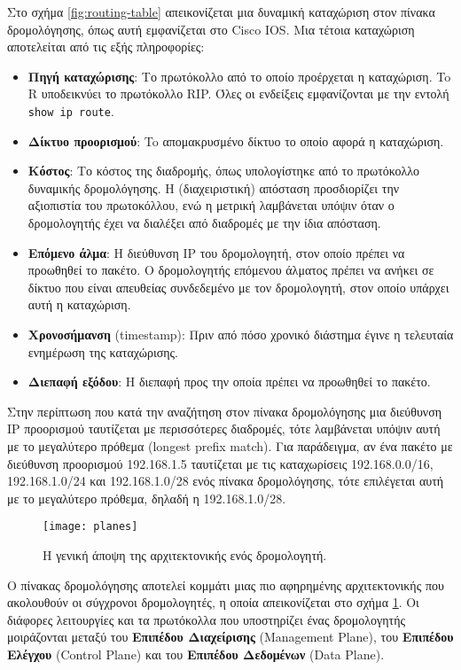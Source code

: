 \documentclass{EdipyLabs} %
\begin{document}
\begin{itemize}
	Στο σχήμα \ref{fig:routing-table} απεικονίζεται μια δυναμική καταχώριση στον πίνακα δρομολόγησης, όπως αυτή εμφανίζεται στο Cisco IOS. Μια τέτοια καταχώριση αποτελείται από τις εξής πληροφορίες:
	\begin{itemize}
		\item \textbf{Πηγή καταχώρισης}: Το πρωτόκολλο από το οποίο προέρχεται η καταχώριση. To R υποδεικνύει το πρωτόκολλο RIP. Όλες οι ενδείξεις εμφανίζονται με την εντολή \texttt{show ip route}.
		\item \textbf{Δίκτυο προορισμού}: To απομακρυσμένο δίκτυο το οποίο αφορά η καταχώριση.
		\item \textbf{Κόστος}: Το κόστος της διαδρομής, όπως υπολογίστηκε από το πρωτόκολλο δυναμικής δρομολόγησης. Η (διαχειριστική) απόσταση προσδιορίζει την αξιοπιστία του πρωτοκόλλου, ενώ η μετρική λαμβάνεται υπόψιν όταν ο δρομολογητής έχει να διαλέξει από διαδρομές με την ίδια απόσταση.
		\item \textbf{Επόμενο άλμα}: Η διεύθυνση IP του δρομολογητή, στον οποίο πρέπει να προωθηθεί το πακέτο. Ο δρομολογητής επόμενου άλματος πρέπει να ανήκει σε δίκτυο που είναι απευθείας συνδεδεμένο με τον δρομολογητή, στον οποίο υπάρχει αυτή η καταχώριση. 
		\item \textbf{Χρονοσήμανση} (timestamp): Πριν από πόσο χρονικό διάστημα έγινε η τελευταία ενημέρωση της καταχώρισης.
		\item \textbf{Διεπαφή εξόδου}: Η διεπαφή προς την οποία πρέπει να προωθηθεί το πακέτο.
	\end{itemize}
\end{itemize}

Στην περίπτωση που κατά την αναζήτηση στον πίνακα δρομολόγησης μια διεύθυνση IP προορισμού ταυτίζεται με περισσότερες διαδρομές, τότε λαμβάνεται υπόψιν αυτή με το μεγαλύτερο πρόθεμα (longest prefix match). Για παράδειγμα, αν ένα πακέτο με διεύθυνση προορισμού 192.168.1.5 ταυτίζεται με τις καταχωρίσεις 192.168.0.0/16, 192.168.1.0/24 και 192.168.1.0/28 ενός πίνακα δρομολόγησης, τότε επιλέγεται αυτή με το μεγαλύτερο πρόθεμα, δηλαδή η 192.168.1.0/28.

\begin{figure}[ht]
	\centering
	\texttt{[image: planes]}
	\caption{Η γενική άποψη της αρχιτεκτονικής ενός δρομολογητή.}\label{fig:planes}
\end{figure}

Ο πίνακας δρομολόγησης αποτελεί κομμάτι μιας πιο αφηρημένης αρχιτεκτονικής που ακολουθούν οι σύγχρονοι δρομολογητές, η οποία απεικονίζεται στο σχήμα \ref{fig:planes}. Οι διάφορες λειτουργίες και τα πρωτόκολλα που υποστηρίζει ένας δρομολογητής μοιράζονται μεταξύ του \textbf{Επιπέδου Διαχείρισης} (Management Plane), του \textbf{Επιπέδου Ελέγχου} (Control Plane) και του \textbf{Επιπέδου Δεδομένων} (Data Plane). 
\end{document}
